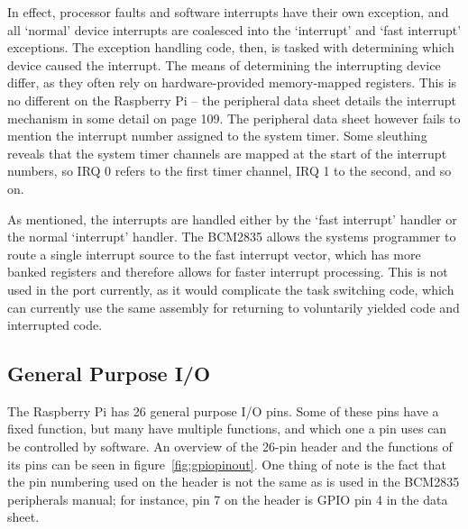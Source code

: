 In effect, processor faults and software interrupts have their own exception, and all `normal' device interrupts are coalesced into the `interrupt' and `fast interrupt' exceptions. The exception handling code, then, is tasked with determining which device caused the interrupt. The means of determining the interrupting device differ, as they often rely on hardware-provided memory-mapped registers. This is no different on the Raspberry Pi -- the peripheral data sheet details the interrupt mechanism in some detail on page 109. The peripheral data sheet however fails to mention the interrupt number assigned to the system timer. Some sleuthing reveals that the system timer channels are mapped at the start of the interrupt numbers, so IRQ 0 refers to the first timer channel, IRQ 1 to the second, and so on.

As mentioned, the interrupts are handled either by the `fast interrupt' handler or the normal `interrupt' handler. The BCM2835 allows the systems programmer to route a single interrupt source to the fast interrupt vector, which has more banked registers and therefore allows for faster interrupt processing. This is not used in the port currently, as it would complicate the task switching code, which can currently use the same assembly for returning to voluntarily yielded code and interrupted code.

\subsection{General Purpose I/O}
The Raspberry Pi has 26 general purpose I/O pins. Some of these pins have a fixed function, but many have multiple functions, and which one a pin uses can be controlled by software. An overview of the 26-pin header and the functions of its pins can be seen in figure~\ref{fig:gpiopinout}. One thing of note is the fact that the pin numbering used on the header is not the same as is used in the BCM2835 peripherals manual; for instance, pin 7 on the header is GPIO pin 4 in the data sheet.

